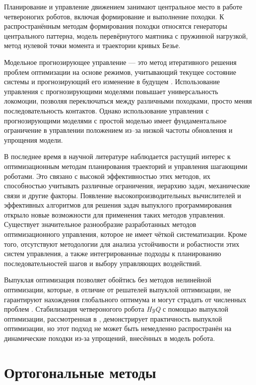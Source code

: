 Планирование и управление движением занимают центральное место в работе четвероногих роботов, включая формирование и выполнение походки. К распространённым методам формирования походки относятся генераторы центрального паттерна, модель перевёрнутого маятника с пружинной нагрузкой, метод нулевой точки момента и траектории кривых Безье.

Модельное прогнозирующее управление --- это метод итеративного решения проблем оптимизации на основе режимов, учитывающий текущее состояние системы и прогнозирующий его изменение в будущем \cite{KIM2019}. Использование управления с прогнозирующими моделями повышает универсальность локомоции, позволяя переключаться между различными походками, просто меняя последовательность контактов. Однако использование управления с прогнозирующими моделями с простой моделью имеет фундаментальное ограничение в управлении положением из--за низкой частоты обновления и упрощения модели. 

В последнее время в научной литературе наблюдается растущий интерес к оптимизационным методам планирования траекторий и управления шагающими роботами. Это связано с высокой эффективностью этих методов, их способностью учитывать различные ограничения, иерархию задач, механические связи и другие факторы. Появление высокопроизводительных вычислителей и эффективных алгоритмов для решения задач выпуклого программирования открыло новые возможности для применения таких методов управления. Существует значительное разнообразие разработанных методов оптимизационного управления, которое не имеет чёткой систематизации. Кроме того, отсутствуют методологии для анализа устойчивости и робастности этих систем управления, а также интегрированные подходы к планированию последовательностей шагов и выбору управляющих воздействий.

Выпуклая оптимизация позволяет обойтись без методов нелинейной оптимизации, которые, в отличие от решателей выпуклой оптимизации, не гарантируют нахождения глобального оптимума и могут страдать от численных проблем \cite{boyd2004convex}. Стабилизация четвероногого робота \textit{HyQ} с помощью выпуклой оптимизации, рассмотренная в \cite{Focchi2016}, демонстрирует практичность выпуклой оптимизации, но этот подход не может быть немедленно распространён на динамические походки из-за  упрощений, внесённых в модель робота.

\section{Ортогональные методы}\label{sec:ch1/sec3}

